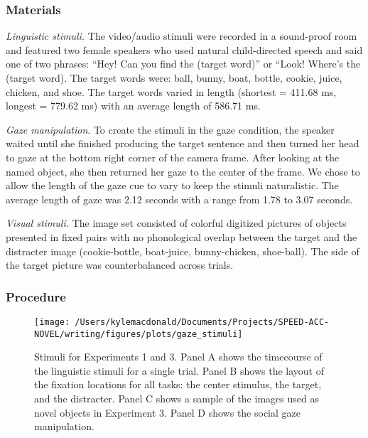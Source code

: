 \documentclass[man,floatsintext]{apa6}
\begin{document}
\subsubsection{Materials}\label{materials}

\emph{Linguistic stimuli.} The video/audio stimuli were recorded in a
sound-proof room and featured two female speakers who used natural
child-directed speech and said one of two phrases: \enquote{Hey! Can you
find the (target word)} or ``Look! Where's the (target word). The target
words were: ball, bunny, boat, bottle, cookie, juice, chicken, and shoe.
The target words varied in length (shortest = 411.68 ms, longest =
779.62 ms) with an average length of 586.71 ms.

\emph{Gaze manipulation}. To create the stimuli in the gaze condition,
the speaker waited until she finished producing the target sentence and
then turned her head to gaze at the bottom right corner of the camera
frame. After looking at the named object, she then returned her gaze to
the center of the frame. We chose to allow the length of the gaze cue to
vary to keep the stimuli naturalistic. The average length of gaze was
2.12 seconds with a range from 1.78 to 3.07 seconds.

\emph{Visual stimuli.} The image set consisted of colorful digitized
pictures of objects presented in fixed pairs with no phonological
overlap between the target and the distracter image (cookie-bottle,
boat-juice, bunny-chicken, shoe-ball). The side of the target picture
was counterbalanced across trials.

\subsubsection{Procedure}\label{procedure}

\begin{figure}[!t]

{\centering \texttt{[image: /Users/kylemacdonald/Documents/Projects/SPEED-ACC-NOVEL/writing/figures/plots/gaze\_stimuli]} 

}

\caption{Stimuli for Experiments 1 and 3. Panel A shows the timecourse of the linguistic stimuli for a single trial. Panel B shows the layout of the fixation locations for all tasks: the center stimulus, the target, and the distracter. Panel C shows a sample of the images used as novel objects in Experiment 3. Panel D shows the social gaze manipulation.}\label{fig:gaze-stimuli}
\end{figure}
\end{document}
